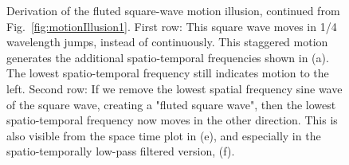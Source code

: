 \begin{figure}
{        \hspace{-0.2in}
        \hspace{-0.4in}
    }
    \caption{Derivation of the fluted square-wave motion illusion, continued from Fig.~\ref{fig:motionIllusion1}.  First row:  This square wave moves in 1/4 wavelength jumps, instead of continuously.  This staggered motion generates the additional spatio-temporal frequencies shown in (a).  The lowest spatio-temporal frequency still indicates motion to the left.  Second row:  If we remove the lowest spatial frequency sine wave of the square wave, creating a "fluted square wave", then the lowest spatio-temporal frequency now moves in the other direction.  This is also visible from the space time plot in (e), and especially in the spatio-temporally low-pass filtered version, (f).}
    \label{fig:motionIllusion2}
\end{figure}



